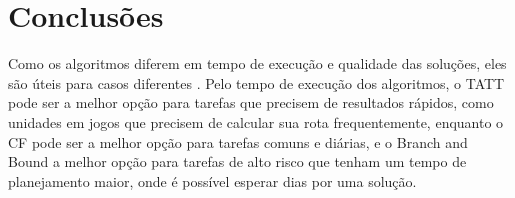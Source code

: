 \documentclass[12pt]{article}
\begin{document}
\pagebreak

\section{Conclusões}
Como os algoritmos diferem em tempo de execução e qualidade das soluções, eles
são úteis para casos diferentes \cite{lawler1985traveling}.
Pelo tempo de execução dos algoritmos, o TATT
pode ser a melhor opção para tarefas que precisem de resultados rápidos,
como unidades em jogos que precisem de calcular sua rota frequentemente,
enquanto o CF pode ser a melhor opção para tarefas comuns e diárias, e o
Branch and Bound a melhor opção para tarefas de alto risco que tenham um tempo
de planejamento maior, onde é possível esperar dias por uma solução.



\end{document}
